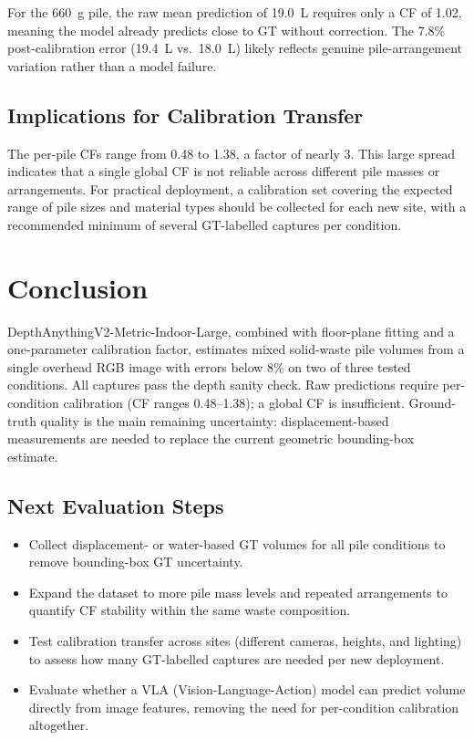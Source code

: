 \documentclass[11pt,a4paper]{article}
\begin{document}
For the 660~g pile, the raw mean prediction of 19.0~L requires only a CF of 1.02, meaning
the model already predicts close to GT without correction. The 7.8\% post-calibration
error (19.4~L vs.\ 18.0~L) likely reflects genuine pile-arrangement variation rather than
a model failure.

\subsection{Implications for Calibration Transfer}

The per-pile CFs range from 0.48 to 1.38, a factor of nearly 3. This large spread indicates
that a single global CF is not reliable across different pile masses or arrangements. For
practical deployment, a calibration set covering the expected range of pile sizes and material
types should be collected for each new site, with a recommended minimum of several GT-labelled
captures per condition.

\section{Conclusion}
\label{sec:conclusion}

DepthAnythingV2-Metric-Indoor-Large, combined with floor-plane fitting and a one-parameter
calibration factor, estimates mixed solid-waste pile volumes from a single overhead RGB image
with errors below 8\% on two of three tested conditions. All captures pass the depth sanity
check. Raw predictions require per-condition calibration (CF ranges 0.48--1.38); a global CF
is insufficient. Ground-truth quality is the main remaining uncertainty: displacement-based
measurements are needed to replace the current geometric bounding-box estimate.

\subsection*{Next Evaluation Steps}

\begin{itemize}[leftmargin=1.5em,topsep=2pt,itemsep=1pt]
    \item Collect displacement- or water-based GT volumes for all pile conditions to remove
    bounding-box GT uncertainty.
    \item Expand the dataset to more pile mass levels and repeated arrangements to quantify
    CF stability within the same waste composition.
    \item Test calibration transfer across sites (different cameras, heights, and lighting) to
    assess how many GT-labelled captures are needed per new deployment.
    \item Evaluate whether a VLA (Vision-Language-Action) model can predict volume directly
    from image features, removing the need for per-condition calibration altogether.
\end{itemize}
\end{document}
